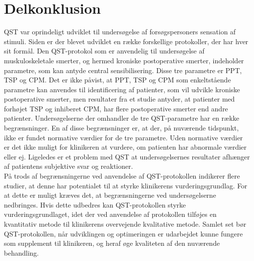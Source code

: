 \section{Delkonklusion}
QST var oprindeligt udviklet til undersøgelse af forsøgspersoners sensation af stimuli. Siden er der blevet udviklet en række forskellige protokoller, der har hver sit formål. Den QST-protokol som er anvendelig til undersøgelse af muskuloskeletale smerter, og hermed kroniske postoperative smerter, indeholder parametre, som kan antyde central sensibilisering. Disse tre parametre er PPT, TSP og CPM. Det er ikke påvist, at PPT, TSP og CPM som enkeltstående parametre kan anvendes til identificering af patienter, som vil udvikle kroniske postoperative smerter, men resultater fra et studie antyder, at patienter med forhøjet TSP og inhiberet CPM, har flere postoperative smerter end andre patienter. Undersøgelserne der omhandler de tre QST-parametre har en række begrænsninger. En af disse begrænsninger er, at der, på nuværende tidspunkt, ikke er fundet normative værdier for de tre parametre. Uden normative værdier er det ikke muligt for klinikeren at vurdere, om patienten har abnormale værdier eller ej. Ligeledes er et problem med QST at undersøgelsernes resultater afhænger af patientens subjektive svar og reaktioner. \\
På trods af begrænsningerne ved anvendelse af QST-protokollen indikerer flere studier, at denne har potentialet til at styrke klinikerens vurderingsgrundlag. For at dette er muligt kræves det, at begrænsningerne ved undersøgelserne nedbringes. Hvis dette udbedres kan QST-protokollen styrke vurderingsgrundlaget, idet der ved anvendelse af protokollen tilføjes en kvantitativ metode til klinikerens overvejende kvalitative metode. Samlet set bør QST-protokollen, når udviklingen og optimeringen er udarbejdet kunne fungere som supplement til klinikeren, og heraf øge kvaliteten af den nuværende behandling.



